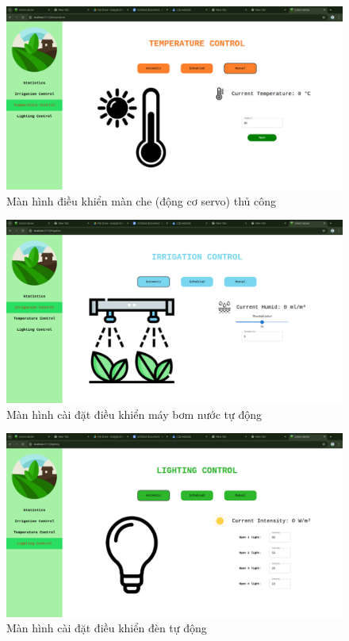 \begin{figure}[H]
    \centering
    \includegraphics[width=1\linewidth]{content/images/temp_manual.png}
    \caption{Màn hình điều khiển màn che (động cơ servo) thủ công}
\end{figure}

\begin{figure}[H]
    \centering
    \includegraphics[width=1\linewidth]{content/images/pump_automatic.png}
    \caption{Màn hình cài đặt điều khiển máy bơm nước tự động}
\end{figure}

\begin{figure}[H]
    \centering
    \includegraphics[width=1\linewidth]{content/images/light_automatic.png}
    \caption{Màn hình cài đặt điều khiển đèn tự động}
\end{figure}

